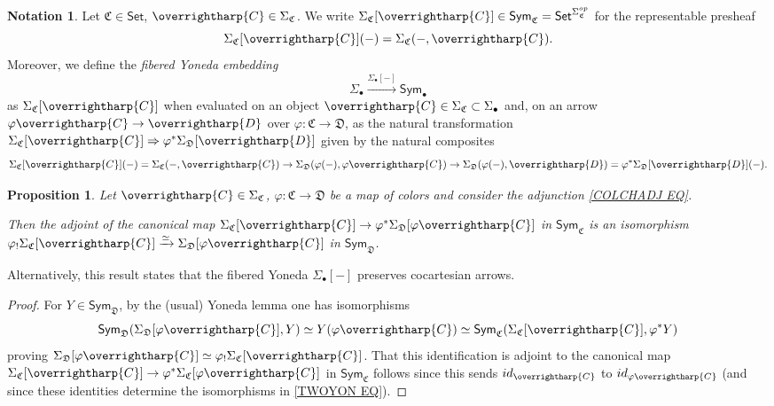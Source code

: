 \documentclass[a4paper,10pt
,draft
]{article}%
\numberwithin{equation}{section}
\numberwithin{figure}{section}
\newtheorem{proposition}[equation]{Proposition}%
\theoremstyle{definition} %
\newtheorem{notation}[equation]{Notation}%
\newcommand{\vect}[1]{\text{\overrightharp{\ensuremath{#1}}}}
\newcommand{\1}{\ensuremath{\mathbbm 1}}%
\begin{document}
\begin{notation}\label{FIBYON NOT}
	Let $\mathfrak{C} \in \mathsf{Set}$, $\vect{C} \in \Sigma_{\mathfrak{C}}$.
	We write
	$\Sigma_{\mathfrak{C}}[\vect{C}] 
	\in \mathsf{Sym}_{\mathfrak{C}} = \mathsf{Set}^{\Sigma_{\mathfrak{C}}^{op}}$ for the representable presheaf
	\[\Sigma_{\mathfrak{C}}[\vect{C}](-)
	= \Sigma_{\mathfrak{C}}(-,\vect{C}).\]
	Moreover, we define the \emph{fibered Yoneda embedding}
	\begin{equation}\label{FIBYON EQ}
	\Sigma_{\bullet} \xrightarrow{\Sigma_{\bullet}[-]} \mathsf{Sym}_{\bullet}
	\end{equation}
	as $\Sigma_{\mathfrak{C}}[\vect{C}]$
	when evaluated on an object
	$\vect{C} \in \Sigma_{\mathfrak{C}} \subset \Sigma_{\bullet}$
	and, on an arrow 
	$\varphi \vect{C} \to \vect{D}$
	over $\varphi \colon \mathfrak{C} \to \mathfrak{D}$,
	as the natural transformation
	$\Sigma_{\mathfrak{C}}[\vect{C}]
	\Rightarrow
	\varphi^{\**}
	\Sigma_{\mathfrak{D}}[\vect{D}]
	$ given by the natural composites
	\[\Sigma_{\mathfrak{C}}[\vect{C}](-)
	= \Sigma_{\mathfrak{C}}(-,\vect{C})
	\to 
	\Sigma_{\mathfrak{D}}(\varphi(-),\varphi\vect{C})
	\to
	\Sigma_{\mathfrak{D}}(\varphi(-),\vect{D})
	=
	\varphi^{\**} \Sigma_{\mathfrak{D}}[\vect{D}](-).
	\]
\end{notation}



\begin{proposition}\label{FIBYONPUSH PROP}
	Let $\vect{C} \in \Sigma_{\mathfrak{C}}$,
	$\varphi \colon \mathfrak{C} \to \mathfrak{D}$
	be a map of colors and consider the adjunction \eqref{COLCHADJ EQ}.
	
	Then the adjoint of the canonical map
	$\Sigma_{\mathfrak{C}}[\vect{C}]
	\to
	\varphi^{\**}\Sigma_{\mathfrak{D}}[\varphi\vect{C}]$
	in $\mathsf{Sym}_{\mathfrak{C}}$
	is an isomorphism
	$\varphi_{!} \Sigma_{\mathfrak{C}}[\vect{C}]
	\xrightarrow{\simeq}
	\Sigma_{\mathfrak{D}}[\varphi\vect{C}]$
	in $\mathsf{Sym}_{\mathfrak{D}}$.
\end{proposition}


Alternatively, this result states that 
the fibered Yoneda $\Sigma_{\bullet}[-]$
preserves cocartesian arrows.


\begin{proof}
	For $Y \in \mathsf{Sym}_{\mathfrak{D}}$, by the (usual) Yoneda lemma one has isomorphisms
	\begin{equation}\label{TWOYON EQ}
	\mathsf{Sym}_{\mathfrak{D}}
	(\Sigma_{\mathfrak{D}}[\varphi \vect{C}],Y)
	\simeq
	Y(\varphi \vect{C})
	\simeq
	\mathsf{Sym}_{\mathfrak{C}}(\Sigma_{\mathfrak{C}}[\vect{C}],\varphi^{\**}Y)
	\end{equation}
	proving 
	$\Sigma_{\mathfrak{D}}[\varphi \vect{C}] \simeq \varphi_! \Sigma_{\mathfrak{C}}[\vect{C}]$.
	That this identification is adjoint to the canonical map
	$\Sigma_{\mathfrak{C}}[\vect{C}]
	\to
	\varphi^{\**}\Sigma_{\mathfrak{C}}[\varphi\vect{C}]$
	in $\mathsf{Sym}_{\mathfrak{C}}$
	follows since this sends
	$id_{\vect{C}}$ to $id_{\varphi\vect{C}}$
	(and since these identities determine the isomorphisms in \eqref{TWOYON EQ}).
\end{proof}
\end{document}
